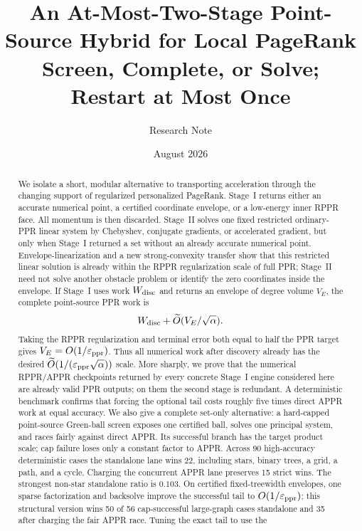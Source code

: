 \documentclass[11pt]{article}
\title{An At-Most-Two-Stage Point-Source Hybrid for Local PageRank\\
\large Screen, Complete, or Solve; Restart at Most Once}
\author{Research Note}
\date{August 2026}
\begin{document}
\maketitle

\begin{abstract}
We isolate a short, modular alternative to transporting acceleration through
the changing support of regularized personalized PageRank.  Stage~I returns
either an accurate numerical point, a certified coordinate envelope, or a
low-energy inner RPPR face.  All momentum is then discarded.  Stage~II solves
one fixed restricted ordinary-PPR linear system by Chebyshev, conjugate
gradients, or accelerated gradient, but only when Stage~I returned a set
without an already accurate numerical point.  Envelope-linearization and a
new strong-convexity transfer show that this restricted
linear solution is already within the RPPR regularization scale of full PPR;
Stage~II need not solve another obstacle problem or identify the zero
coordinates inside the envelope.  If Stage~I uses work $W_{\rm disc}$ and
returns an envelope of degree
volume $V_E$, the complete point-source PPR work is
\[
 W_{\rm disc}+\widetilde O(V_E/\sqrt\alpha).
\]
Taking the RPPR regularization and terminal error both equal to half the PPR
target gives $V_E=O(1/\varepsilon_{\rm ppr})$.  Thus all numerical work after
discovery already has the desired
$\widetilde O(1/(\varepsilon_{\rm ppr}\sqrt\alpha))$ scale.  More sharply,
we prove that the numerical RPPR/APPR checkpoints returned by every concrete
Stage~I engine considered here are already valid PPR outputs; on them the
second stage is redundant.  A deterministic benchmark confirms that forcing
the optional tail costs roughly five times direct APPR work at equal accuracy.
We also give a complete set-only alternative: a hard-capped point-source
Green-ball screen exposes one certified ball, solves one principal system,
and races fairly against direct APPR.  Its successful branch has the target
product scale; cap failure loses only a constant factor to APPR.  Across 90
high-accuracy deterministic cases the standalone lane wins 22, including
stars, binary trees, a grid, a path, and a cycle.  Charging the concurrent
APPR lane preserves 15 strict wins.  The strongest non-star standalone ratio
is $0.103$.
On certified fixed-treewidth envelopes, one sparse factorization and
backsolve improve the successful tail to $O(1/\varepsilon_{\rm ppr})$; this
structural version wins 50 of 56 cap-successful large-graph cases standalone
and 35 after charging the fair APPR race.  Tuning the exact tail to use the

\end{abstract}
\end{document}
